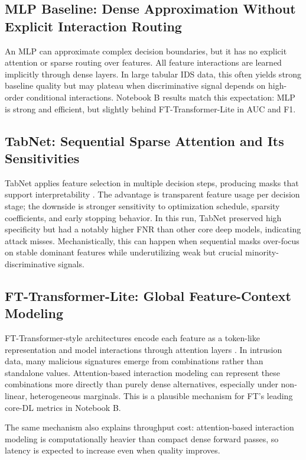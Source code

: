 \documentclass[10pt,journal]{IEEEtran}
\begin{document}
\subsection{MLP Baseline: Dense Approximation Without Explicit Interaction Routing}
An MLP can approximate complex decision boundaries, but it has no explicit attention or sparse routing over features. All feature interactions are learned implicitly through dense layers. In large tabular IDS data, this often yields strong baseline quality but may plateau when discriminative signal depends on high-order conditional interactions. Notebook B results match this expectation: MLP is strong and efficient, but slightly behind FT-Transformer-Lite in AUC and F1.

\subsection{TabNet: Sequential Sparse Attention and Its Sensitivities}
TabNet applies feature selection in multiple decision steps, producing masks that support interpretability \cite{arik2021tabnet}. The advantage is transparent feature usage per decision stage; the downside is stronger sensitivity to optimization schedule, sparsity coefficients, and early stopping behavior. In this run, TabNet preserved high specificity but had a notably higher FNR than other core deep models, indicating attack misses. Mechanistically, this can happen when sequential masks over-focus on stable dominant features while underutilizing weak but crucial minority-discriminative signals.

\subsection{FT-Transformer-Lite: Global Feature-Context Modeling}
FT-Transformer-style architectures encode each feature as a token-like representation and model interactions through attention layers \cite{gorishniy2021revisiting}. In intrusion data, many malicious signatures emerge from combinations rather than standalone values. Attention-based interaction modeling can represent these combinations more directly than purely dense alternatives, especially under non-linear, heterogeneous marginals. This is a plausible mechanism for FT's leading core-DL metrics in Notebook B.

The same mechanism also explains throughput cost: attention-based interaction modeling is computationally heavier than compact dense forward passes, so latency is expected to increase even when quality improves.
\end{document}
